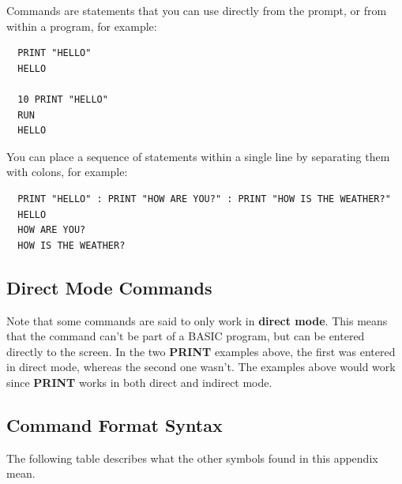 Commands are statements that you can use directly from the 
prompt, or from within a program, for example:

\begin{tcolorbox}[colback=black,coltext=white]
\verbatimfont{\codefont}
\begin{verbatim}
  PRINT "HELLO"
  HELLO

  10 PRINT "HELLO"
  RUN
  HELLO
\end{verbatim}
\end{tcolorbox}

You can place a sequence of statements within a single line by separating them with colons, for example:

\begin{tcolorbox}[colback=black,coltext=white]
\verbatimfont{\codefont}
\begin{verbatim}
  PRINT "HELLO" : PRINT "HOW ARE YOU?" : PRINT "HOW IS THE WEATHER?"
  HELLO
  HOW ARE YOU?
  HOW IS THE WEATHER?
\end{verbatim}
\end{tcolorbox}

\subsection{Direct Mode Commands}
Note that some commands are said to only work in {\bf direct mode}. This means that the command can't be part of a BASIC
program, but can be entered directly to the screen. In the two {\bf PRINT} examples above, the first was entered in
direct mode, whereas the second one wasn't. The examples above would work since {\bf PRINT} works in both direct and indirect mode.

\subsection{Command Format Syntax}
The following table describes what the other symbols found in this appendix mean.

